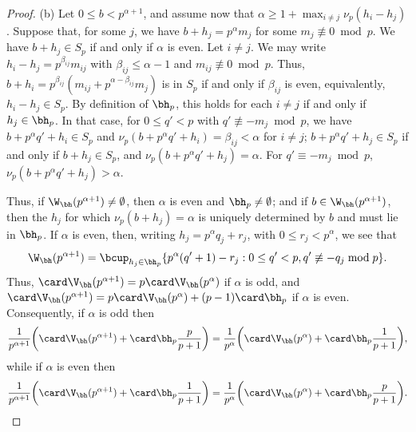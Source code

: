 \documentclass[12pt, reqno, twoside, letterpaper]{amsart}
\begin{document}
\begin{proof}
(b)
%
Let $0 \le b < p^{\alpha + 1}$, and assume now that 
$\alpha \ge 1 + \max_{i \ne j} \nu_p(h_i - h_j)$.
%
Suppose that, for some $j$, we have $b + h_j = p^{\alpha}m_j$ 
for some $m_j \not\equiv 0 \bmod p$.
%
We have $b + h_j \in S_p$ if and only if $\alpha$ is even.
%
Let $i \ne j$.
%
We may write $h_i - h_j = p^{\beta_{ij}}m_{ij}$ with 
$\beta_{ij} \le \alpha - 1$ and $m_{ij} \not\equiv 0 \bmod p$.
%
Thus, 
$b + h_i = p^{\beta_{ij}}(m_{ij} + p^{\alpha - \beta_{ij}}m_j)$ 
is in $S_p$ if and only if $\beta_{ij}$ is even, equivalently, 
$h_i - h_j \in S_p$.
%
By definition of $\bh_p$, this holds for each $i \ne j$ if and 
only if $h_j \in \bh_{p}$.
%
In that case, for $0 \le q' < p$ with 
$q' \not\equiv -m_j \bmod p$, we have 
$b + p^{\alpha}q' + h_i \in S_p$ and 
$\nu_p(b + p^{\alpha}q' + h_i) = \beta_{ij} < \alpha$ 
for $i \ne j$;    
$b + p^{\alpha}q' + h_j \in S_p$ if and only if $b + h_j \in S_p$, 
and $\nu_p(b + p^{\alpha}q' + h_j) = \alpha$.
%
For $q' \equiv -m_j \bmod p$, 
$\nu_p(b + p^{\alpha}q' + h_j) > \alpha$.

Thus, if $\W_{\bh}(p^{\alpha + 1}) \ne \emptyset$, then 
$\alpha$ is even and $\bh_p \ne \emptyset$; and if 
$b \in \W_{\bh}(p^{\alpha + 1})$, then the $h_j$ for which 
$\nu_p(b + h_j) = \alpha$ is uniquely determined by $b$ and must 
lie in $\bh_p$.
%
If $\alpha$ is even, then, writing $h_j = p^{\alpha}q_j + r_j$, 
with $0 \le r_j < p^{\alpha}$, we see that 
\[
 \W_{\bh}(p^{\alpha + 1}) 
  = 
   \bcup_{h_j \in \bh_p}
    \{p^{\alpha}(q' + 1) - r_j : 0 \le q' < p, q' \not\equiv -q_j \bmod p\}.
\]
%
Thus, 
$
 \card \V_{\bh}(p^{\alpha + 1})
  = 
   p\card \V_{\bh}(p^{\alpha}) 
$
if $\alpha$ is odd, and 
$
 \card \V_{\bh}(p^{\alpha + 1})
  = 
   p\card \V_{\bh}(p^{\alpha}) + (p - 1)\card \bh_p 
$
if $\alpha$ is even.
%
%
Consequently, if $\alpha$ is odd then 
\[
 \frac{1}{p^{\alpha + 1}}
  \bigg(
     \card \V_{\bh}(p^{\alpha + 1}) + \card\bh_p\frac{p}{p + 1}
  \bigg)
   =
 \frac{1}{p^{\alpha}}
  \bigg(
     \card \V_{\bh}(p^{\alpha}) + \card\bh_p\frac{1}{p + 1}
  \bigg),
\]
while if $\alpha$ is even then 
\[
 \frac{1}{p^{\alpha + 1}}
  \bigg(
     \card \V_{\bh}(p^{\alpha + 1}) + \card\bh_p\frac{1}{p + 1}
  \bigg)
   =
 \frac{1}{p^{\alpha}}
  \bigg(
     \card \V_{\bh}(p^{\alpha}) + \card\bh_p\frac{p}{p + 1}
  \bigg).
\]


\end{proof}
\end{document}
